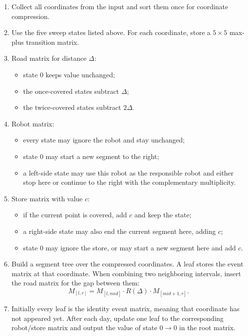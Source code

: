 \documentclass[11pt]{article}
\begin{document}
\begin{enumerate}[leftmargin=*]
    \item Collect all coordinates from the input and sort them once for coordinate compression.

    \item Use the five sweep states listed above. For each coordinate, store a $5 \times 5$ max-plus transition matrix.

    \item Road matrix for distance $\Delta$:
    \begin{itemize}[leftmargin=*]
        \item state $0$ keeps value unchanged;
        \item the once-covered states subtract $\Delta$;
        \item the twice-covered states subtract $2\Delta$.
    \end{itemize}

    \item Robot matrix:
    \begin{itemize}[leftmargin=*]
        \item every state may ignore the robot and stay unchanged;
        \item state $0$ may start a new segment to the right;
        \item a left-side state may use this robot as the responsible robot and either stop here or continue to the right with the complementary multiplicity.
    \end{itemize}

    \item Store matrix with value $c$:
    \begin{itemize}[leftmargin=*]
        \item if the current point is covered, add $c$ and keep the state;
        \item a right-side state may also end the current segment here, adding $c$;
        \item state $0$ may ignore the store, or may start a new segment here and add $c$.
    \end{itemize}

    \item Build a segment tree over the compressed coordinates. A leaf stores the event matrix at that coordinate. When combining two neighboring intervals, insert the road matrix for the gap between them:
    \[
    M_{[l,r]} = M_{[l,mid]} \cdot R(\Delta) \cdot M_{[mid+1,r]}.
    \]

    \item Initially every leaf is the identity event matrix, meaning that coordinate has not appeared yet. After each day, update one leaf to the corresponding robot/store matrix and output the value of state $0 \to 0$ in the root matrix.
\end{enumerate}
\end{document}
